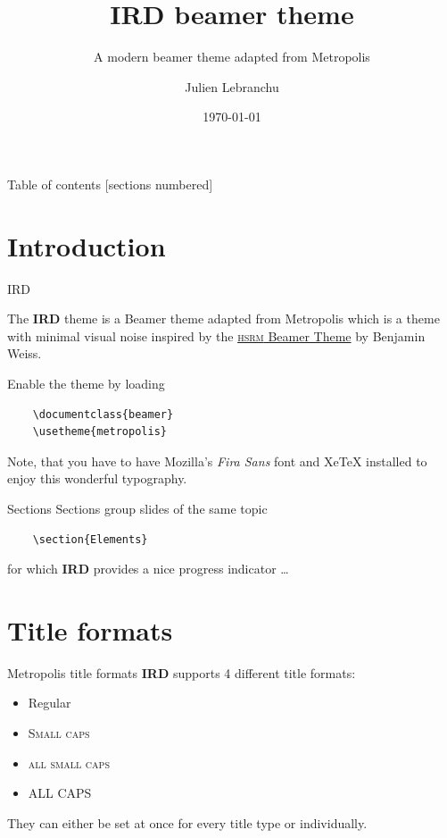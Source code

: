 \documentclass[12pt,aspectratio=169]{beamer}
\title{IRD beamer theme}
\subtitle{A modern beamer theme adapted from Metropolis}
\date{\today}
\author{Julien Lebranchu}
\institute{Ob7/UMR 248 MARBEC/IRD}
\newcommand{\themename}{\textbf{\textsc{IRD}}\xspace}
\begin{document}
\maketitle

\begin{frame}{Table of contents}
  [sections numbered]
  \tableofcontents[hideallsubsections]
\end{frame}

\section{Introduction}

\begin{frame}[fragile]{IRD}

  The \themename theme is a Beamer theme adapted from Metropolis which is a theme with minimal visual noise
  inspired by the \href{https://github.com/hsrmbeamertheme/hsrmbeamertheme}{\textsc{hsrm} Beamer
  Theme} by Benjamin Weiss.

  Enable the theme by loading

  \begin{verbatim}    \documentclass{beamer}
    \usetheme{metropolis}\end{verbatim}

  Note, that you have to have Mozilla's \emph{Fira Sans} font and XeTeX
  installed to enjoy this wonderful typography.
\end{frame}
\begin{frame}[fragile]{Sections}
  Sections group slides of the same topic

  \begin{verbatim}    \section{Elements}\end{verbatim}

  for which \themename provides a nice progress indicator \ldots
\end{frame}

\section{Title formats}

\begin{frame}{Metropolis title formats}
	\themename supports 4 different title formats:
	\begin{itemize}
		\item Regular
		\item \textsc{Small caps}
		\item \textsc{all small caps}
		\item ALL CAPS
	\end{itemize}
	They can either be set at once for every title type or individually.
\end{frame}
\end{document}
